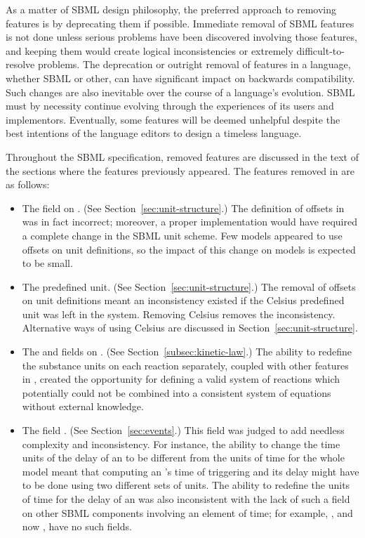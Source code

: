 As a matter of SBML design philosophy, the preferred approach to
removing features is by deprecating them if possible.  Immediate
removal of SBML features is not done unless serious problems have
been discovered involving those features, and keeping them would
create logical inconsistencies or extremely difficult-to-resolve
problems.  The deprecation or outright removal of features in a
language, whether SBML or other, can have significant impact on
backwards compatibility.  Such changes are also inevitable over
the course of a language's evolution.  SBML must by necessity
continue evolving through the experiences of its users and
implementors.  Eventually, some features will be deemed unhelpful
despite the best intentions of the language editors to design a
timeless language.

Throughout the SBML specification, removed features are discussed
in the text of the sections where the features previously appeared.
The features removed in \changed{\sbmltwothree} are as follows:
\begin{itemize}
  
\item The  field on \UnitDefinition.  (See
  Section~\ref{sec:unit-structure}.)  The definition of offsets in
  \sbmltwoone was in fact incorrect; moreover, a proper
  implementation would have required a complete change in the SBML
  unit scheme.  Few models appeared to use offsets on unit
  definitions, so the impact of this change on models is expected
  to be small.
  
\item The  predefined unit.  (See
  Section~\ref{sec:unit-structure}.)  The removal of offsets on
  unit definitions meant an inconsistency existed if the Celsius
  predefined unit was left in the system.  Removing Celsius
  removes the inconsistency.  Alternative ways of using Celsius
  are discussed in Section~\ref{sec:unit-structure}.
  
\item The  and  fields on
  \KineticLaw.  (See Section~\ref{subsec:kinetic-law}.)  The
  ability to redefine the substance units on each reaction
  separately, coupled with other features in \sbmltwotwo, created
  the opportunity for defining a valid system of reactions which
  potentially could not be combined into a consistent system of
  equations without external knowledge.

\item The  field \Event.  (See
  Section~\ref{sec:events}.)  This field was judged to add
  needless complexity and inconsistency.  For instance, the
  ability to change the time units of the delay of an \Event to be
  different from the units of time for the whole model meant that
  computing an \Event's time of triggering and its delay might
  have to be done using two different sets of units.  The ability
  to redefine the units of time for the delay of an \Event was
  also inconsistent with the lack of such a field on other SBML
  components involving an element of time; for example, \RateRule,
  and now \KineticLaw, have no such fields.

\end{itemize}
